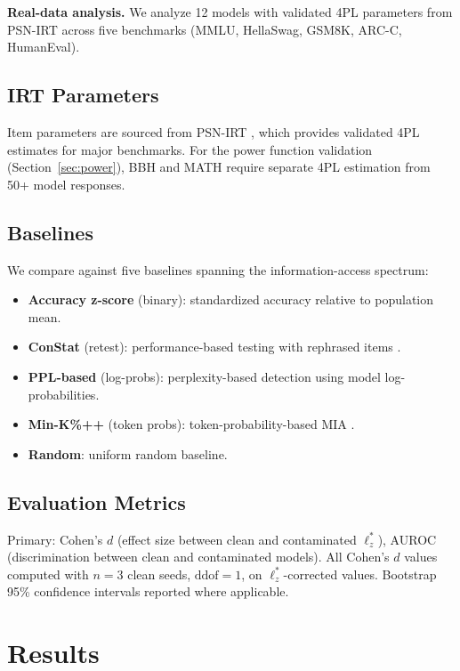 \documentclass[11pt,a4paper]{article}
\begin{document}
\textbf{Real-data analysis.}
We analyze 12 models with validated 4PL parameters from PSN-IRT across five benchmarks (MMLU, HellaSwag, GSM8K, ARC-C, HumanEval).

\subsection{IRT Parameters}

Item parameters are sourced from PSN-IRT \citep{psnirt2026}, which provides validated 4PL estimates for major benchmarks.
For the power function validation (Section~\ref{sec:power}), BBH and MATH require separate 4PL estimation from 50+ model responses.

\subsection{Baselines}

We compare against five baselines spanning the information-access spectrum:
\begin{itemize}
\item \textbf{Accuracy z-score} (binary): standardized accuracy relative to population mean.
\item \textbf{ConStat} (retest): performance-based testing with rephrased items \citep{oren2024proving}.
\item \textbf{PPL-based} (log-probs): perplexity-based detection using model log-probabilities.
\item \textbf{Min-K\%++} (token probs): token-probability-based MIA \citep{shi2024detecting}.
\item \textbf{Random}: uniform random baseline.
\end{itemize}

\subsection{Evaluation Metrics}

Primary: Cohen's $d$ (effect size between clean and contaminated $\ell_z^*$), AUROC (discrimination between clean and contaminated models).
All Cohen's $d$ values computed with $n=3$ clean seeds, $\text{ddof}=1$, on $\ell_z^*$-corrected values.
Bootstrap 95\% confidence intervals reported where applicable.

\section{Results}
\end{document}
